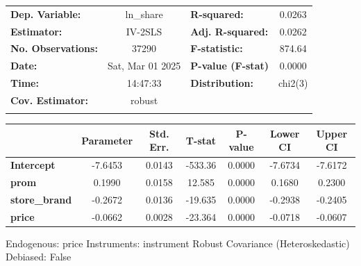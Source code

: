 \documentclass[11pt]{article}
\begin{document}
    \begin{center}
\begin{tabular}{lclc}
\toprule
\textbf{Dep. Variable:}    &     ln\_share      & \textbf{  R-squared:         } &      0.0263      \\
\textbf{Estimator:}        &      IV-2SLS       & \textbf{  Adj. R-squared:    } &      0.0262      \\
\textbf{No. Observations:} &       37290        & \textbf{  F-statistic:       } &      874.64      \\
\textbf{Date:}             &  Sat, Mar 01 2025  & \textbf{  P-value (F-stat)   } &      0.0000      \\
\textbf{Time:}             &      14:47:33      & \textbf{  Distribution:      } &     chi2(3)      \\
\textbf{Cov. Estimator:}   &       robust       & \textbf{                     } &                  \\
\textbf{}                  &                    & \textbf{                     } &                  \\
\bottomrule
\end{tabular}
\begin{tabular}{lcccccc}
                      & \textbf{Parameter} & \textbf{Std. Err.} & \textbf{T-stat} & \textbf{P-value} & \textbf{Lower CI} & \textbf{Upper CI}  \\
\midrule
\textbf{Intercept}    &      -7.6453       &       0.0143       &     -533.36     &      0.0000      &      -7.6734      &      -7.6172       \\
\textbf{prom}         &       0.1990       &       0.0158       &      12.585     &      0.0000      &       0.1680      &       0.2300       \\
\textbf{store\_brand} &      -0.2672       &       0.0136       &     -19.635     &      0.0000      &      -0.2938      &      -0.2405       \\
\textbf{price}        &      -0.0662       &       0.0028       &     -23.364     &      0.0000      &      -0.0718      &      -0.0607       \\
\bottomrule
\end{tabular}
\end{center}

Endogenous: price \newline
 Instruments: instrument \newline
 Robust Covariance (Heteroskedastic) \newline
 Debiased: False
\end{document}
